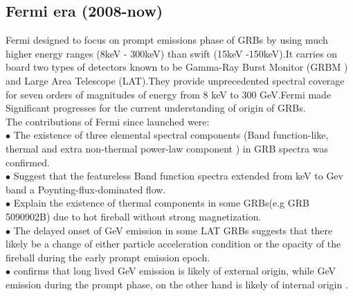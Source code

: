 \subsection{Fermi era (2008-now)}
 Fermi designed to focus on prompt emissions phase of GRBs by using  much higher energy ranges (8keV - 300keV) than swift (15keV -150keV).It carries on board two types of detectors known to be  Gamma-Ray Burst Monitor (GRBM ) and Large Area Telescope (LAT).They provide unprecedented spectral coverage for seven orders of magnitudes of energy from 8 keV to 300 GeV.Fermi made Significant progresses for the current understanding of origin of GRBs.\\ 	The contributions of Fermi since launched were:\\
$\bullet$ The existence of three elemental spectral components (Band function-like, thermal and extra non-thermal power-law component ) in GRB spectra was confirmed.\\
$\bullet$ Suggest that the featureless Band function spectra extended from keV to Gev band a Poynting-flux-dominated flow.\\
$\bullet$ Explain the existence of thermal components in some GRBs(e.g GRB 5090902B) due to hot fireball without strong magnetization.\\
$\bullet$ The delayed onset of GeV emission in some LAT GRBs suggests that there likely be a change of either particle acceleration condition or the opacity of the fireball during the early prompt emission epoch.\\
$\bullet$ confirms that long lived GeV emission is likely of external origin, while GeV emission during the prompt phase, on the other hand is likely of internal origin \citep{10} \citep{11}.
